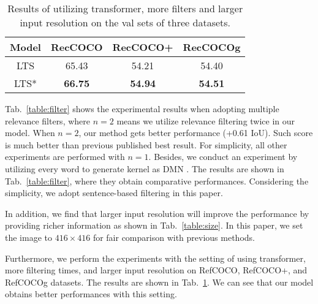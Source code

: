 \begin{table}[!ht]
\begin{center}
\caption{Results of utilizing transformer, more filters and larger input resolution on the val sets of three datasets.}
\label{table:best}
\begin{tabular}{|c||c|c|c|}
\hline
{Model}&{RecCOCO}&{RecCOCO+}&{RecCOCOg} \\
\hline
\hline
{LTS}&{65.43}&{54.21}&{54.40}\\
\hline
{LTS*}&{\textbf{66.75}}&{\textbf{54.94}}&{\textbf{54.51}}\\
\hline
\end{tabular}
\end{center}
\end{table}


Tab.~\ref{table:filter} shows the experimental results when adopting multiple relevance filters, where $n=2$ means we utilize relevance filtering twice in our model. When $n=2$, our method gets better performance (+0.61 IoU). Such score is much better than previous published best result. For simplicity, all other experiments are performed with $n=1$. Besides, we conduct an experiment by utilizing every word to generate kernel as DMN \cite{margffoy2018dynamic}. The results are shown in Tab.~\ref{table:filter}, where they obtain comparative performances. Considering the simplicity, we adopt sentence-based filtering in this paper.  


In addition, we find that larger input resolution will improve the performance by providing richer information as shown in Tab.~\ref{table:size}. In this paper, we set the image to $416\times416$ for fair comparison with previous methods.

Furthermore, we perform the experiments with the setting of using transformer, more filtering times, and larger input resolution on RefCOCO, RefCOCO+, and RefCOCOg datasets. The results are shown in Tab.~\ref{table:best}. We can see that our model obtains better performances with this setting. 


